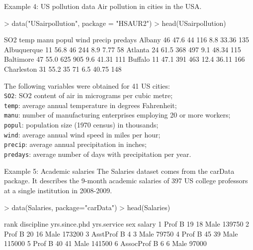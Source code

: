 \documentclass[11pt,handout,aspectratio=169]{beamer}
\begin{document}
\begin{frame}[fragile]{Example 4: US pollution data}
Air pollution in cities in the USA. 
{\scriptsize
\begin{Schunk}
\begin{Sinput}
> data("USairpollution", package = "HSAUR2")
> head(USairpollution)
\end{Sinput}
\begin{Soutput}
            SO2 temp manu popul wind precip predays
Albany       46 47.6   44   116  8.8  33.36     135
Albuquerque  11 56.8   46   244  8.9   7.77      58
Atlanta      24 61.5  368   497  9.1  48.34     115
Baltimore    47 55.0  625   905  9.6  41.31     111
Buffalo      11 47.1  391   463 12.4  36.11     166
Charleston   31 55.2   35    71  6.5  40.75     148
\end{Soutput}
\end{Schunk}
The following variables were obtained for 41 US cities:\\
\texttt{SO2}: SO2 content of air in micrograms per cubic metre;\\
\texttt{temp}: average annual temperature in degrees Fahrenheit;\\
\texttt{manu}: number of manufacturing enterprises employing 20 or more workers;\\
\texttt{popul}: population size (1970 census) in thousands;\\
\texttt{wind}: average annual wind speed in miles per hour;\\
\texttt{precip}: average annual precipitation in inches;\\
\texttt{predays}: average number of days with precipitation per year.

}
\end{frame}

\begin{frame}[fragile]{Example 5: Academic salaries}
The Salaries dataset comes from the carData package. It describes the 9-month academic salaries of 397 US college professors at a single institution in
2008-2009.
\scriptsize
\begin{Schunk}
\begin{Sinput}
> 	data(Salaries, package="carData")
> head(Salaries)
\end{Sinput}
\begin{Soutput}
       rank discipline yrs.since.phd yrs.service  sex salary
1      Prof          B            19          18 Male 139750
2      Prof          B            20          16 Male 173200
3  AsstProf          B             4           3 Male  79750
4      Prof          B            45          39 Male 115000
5      Prof          B            40          41 Male 141500
6 AssocProf          B             6           6 Male  97000
\end{Soutput}
\end{Schunk}
\end{frame}
\end{document}
